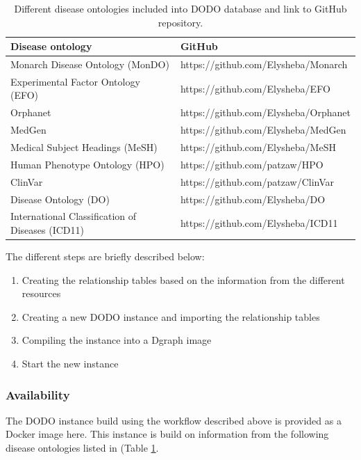 \documentclass[9pt,a4paper,]{extarticle}
\begin{document}
\begin{table}

\caption{\label{tab:githubOntology}Different disease ontologies included into DODO database and link to GitHub repository.}
\centering
\begin{tabular}[t]{ll}
\toprule
Disease ontology & GitHub\\
\midrule
Monarch Disease Ontology (MonDO) & https://github.com/Elysheba/Monarch\\
Experimental Factor Ontology (EFO) & https://github.com/Elysheba/EFO\\
Orphanet & https://github.com/Elysheba/Orphanet\\
MedGen & https://github.com/Elysheba/MedGen\\
Medical Subject Headings (MeSH) & https://github.com/Elysheba/MeSH\\
\addlinespace
Human Phenotype Ontology (HPO) & https://github.com/patzaw/HPO\\
ClinVar & https://github.com/patzaw/ClinVar\\
Disease Ontology (DO) & https://github.com/Elysheba/DO\\
International Classification of Diseases (ICD11) & https://github.com/Elysheba/ICD11\\
\bottomrule
\end{tabular}
\end{table}

The different steps are briefly described below:

\begin{enumerate}
\def\labelenumi{\arabic{enumi}.}
\item
  Creating the relationship tables based on the information from the different resources
\item
  Creating a new DODO instance and importing the relationship tables
\item
  Compiling the instance into a Dgraph image
\item
  Start the new instance
\end{enumerate}

\hypertarget{availability}{%
\subsubsection{Availability}\label{availability}}

The DODO instance build using the workflow described above is provided as a Docker image \citep{Docker2017} here.
This instance is build on information from the following disease ontologies listed in (Table \ref{tab:githubOntology}.
\end{document}
